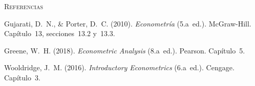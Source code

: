 \documentclass[12pt, letterpaper]{article}
\begin{document}
\vspace{14pt}

\begin{center}
\small\textsc{Referencias}\\[6pt]
\end{center}

\noindent Gujarati, D.~N., \& Porter, D.~C. (2010). \textit{Econometría}
(5.a~ed.). McGraw-Hill. Capítulo~13, secciones~13.2 y~13.3.

\noindent Greene, W.~H. (2018). \textit{Econometric Analysis} (8.a~ed.).
Pearson. Capítulo~5.

\noindent Wooldridge, J.~M. (2016). \textit{Introductory Econometrics}
(6.a~ed.). Cengage. Capítulo~3.
\end{document}
